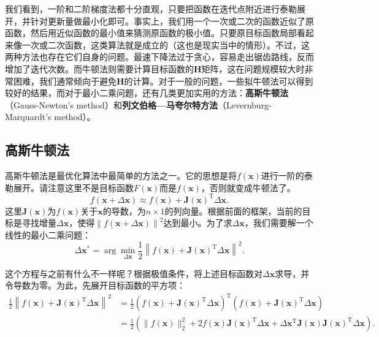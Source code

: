 我们看到，一阶和二阶梯度法都十分直观，只要把函数在迭代点附近进行泰勒展开，并针对更新量做最小化即可。事实上，我们用一个一次或二次的函数近似了原函数，然后用近似函数的最小值来猜测原函数的极小值。只要原目标函数局部看起来像一次或二次函数，这类算法就是成立的（这也是现实当中的情形）。不过，这两种方法也存在它们自身的问题。最速下降法过于贪心，容易走出锯齿路线，反而增加了迭代次数。而牛顿法则需要计算目标函数的$\bm{H}$矩阵，这在问题规模较大时非常困难，我们通常倾向于避免$\bm{H}$的计算。对于一般的问题，一些拟牛顿法可以得到较好的结果，而对于最小二乘问题，还有几类更加实用的方法：\textbf{高斯牛顿法}（Gauss-Newton's method）和\textbf{列文伯格—马夸尔特方法}（Levernburg-Marquardt's method）。

\subsection{高斯牛顿法}
高斯牛顿法是最优化算法中最简单的方法之一。它的思想是将$f(\bm{x})$进行一阶的泰勒展开。请注意这里不是目标函数$F(\bm{x})$而是$f(\bm{x})$，否则就变成牛顿法了。
\begin{equation}
\label{eq:approximation}
f\left( {\bm{x} + \Delta \bm{x}} \right) \approx f\left( \bm{x} \right) + \bm{J} \left( \bm{x} \right)^\mathrm{T} \Delta \bm{x}.
\end{equation}
这里$\bm{J}(\bm{x})$为$f(\bm{x})$关于$\bm{x}$的导数，为$n \times 1$的列向量。根据前面的框架，当前的目标是寻找增量$\Delta \bm{x}$，使得$\left\| {f\left( \bm{x} + \Delta \bm{x} \right)} \right \|^2$达到最小。为了求$\Delta \bm{x}$，我们需要解一个线性的最小二乘问题：
\begin{equation}
\Delta \bm{x}^* = \arg \mathop {\min }\limits_{\Delta \bm{x}} \frac{1}{2}{\left\| {f\left( \bm{x} \right) + \bm{J} \left( \bm{x} \right)^\mathrm{T} \Delta \bm{x} } \right\|^2}.
\end{equation}

这个方程与之前有什么不一样呢？根据极值条件，将上述目标函数对$\Delta \bm{x}$求导，并令导数为零。为此，先展开目标函数的平方项：
\begin{align*}
\frac{1}{2}{\left\| {f\left( \bm{x} \right) + \bm{J} \left( \bm{x} \right)^\mathrm{T} \Delta \bm{x}} \right\|^2} &= \frac{1}{2}{\left( {f\left( \bm{x} \right) + \bm{J}\left( \bm{x} \right)^\mathrm{T} \Delta \bm{x}} \right)^\mathrm{T}}\left( {f\left( \bm{x} \right) + \bm{J} \left( \bm{x} \right)^\mathrm{T} \Delta \bm{x}} \right)\\
&= \frac{1}{2}\left( \| f{{\left( \bm{x} \right)}\|^2_2 + 2 f\left( \bm{x} \right) \bm{J} {{\left( \bm{x} \right)}}^\mathrm{T} \Delta \bm{x} + \Delta { \bm{x}^\mathrm{T}}{\bm{J} (\bm{x})} \bm{J}(\bm{x})^\mathrm{T} \Delta \bm{x}} \right).
\end{align*}

